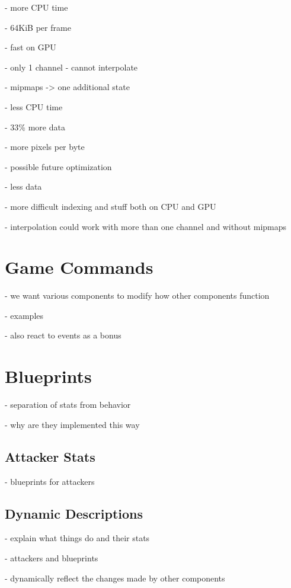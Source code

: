 - more CPU time

- 64KiB per frame

- fast on GPU

- only 1 channel - cannot interpolate

- mipmaps -> one additional state

- less CPU time

- 33\% more data

- more pixels per byte

- possible future optimization

- less data

- more difficult indexing and stuff both on CPU and GPU

- interpolation could work with more than one channel and without mipmaps

\section{Game Commands}

- we want various components to modify how other components function

- examples

- also react to events as a bonus

\section{Blueprints}

- separation of stats from behavior

- why are they implemented this way

\subsection{Attacker Stats}

- blueprints for attackers

\subsection{Dynamic Descriptions}

- explain what things do and their stats

- attackers and blueprints

- dynamically reflect the changes made by other components

